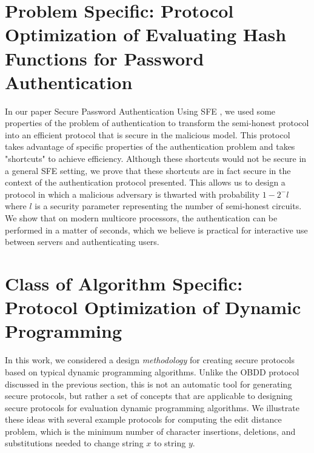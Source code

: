 \section{Problem Specific: Protocol Optimization of Evaluating Hash Functions for Password Authentication}
In our paper Secure Password Authentication Using SFE \cite{Kruger10}, we used some properties of the problem of
authentication to transform the semi-honest protocol into an efficient protocol that is secure in the malicious model.  
This protocol takes
advantage of specific properties of the authentication problem and takes "shortcuts" to achieve efficiency.  Although
these shortcuts would not be secure in a general SFE setting, we prove that these shortcuts are in fact secure in the 
context of the authentication protocol presented.  This allows us to design a protocol in which a malicious adversary
is thwarted with probability $1-2^-l$ where $l$ is a security parameter representing the number of semi-honest circuits.
We show that on modern multicore processors, the authentication can be performed in a matter of seconds, which we believe is practical
for interactive use between servers and authenticating users.

\section{Class of Algorithm Specific: Protocol Optimization of Dynamic Programming}

In this work, we considered a design \emph{methodology} for creating
secure protocols based on typical dynamic programming algorithms.
Unlike the OBDD protocol discussed in the previous section, this is
not an automatic tool for generating secure protocols, but rather
a set of concepts that are applicable to designing secure protocols
for evaluation dynamic programming algorithms. We illustrate these
ideas with several example protocols for computing the edit distance
problem, which is the minimum number of character insertions, deletions,
and substitutions needed to change string $x$ to string $y$.

